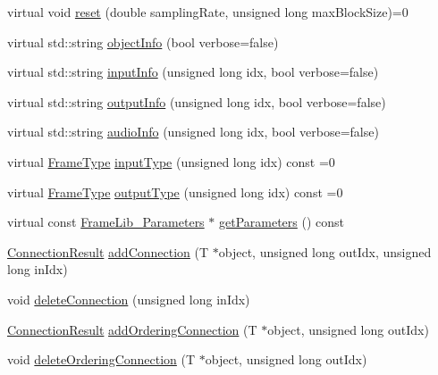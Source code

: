 \begin{DoxyCompactItemize}
\item 
virtual void \hyperlink{class_frame_lib___object_aeb02311ab422dd569aeb982e31a66893}{reset} (double sampling\+Rate, unsigned long max\+Block\+Size)=0
\item 
virtual std\+::string \hyperlink{class_frame_lib___object_a10d673de9a3c59ace6a22ba1cff313c8}{object\+Info} (bool verbose=false)
\item 
virtual std\+::string \hyperlink{class_frame_lib___object_a49abea5f18125c425b1eae8710735891}{input\+Info} (unsigned long idx, bool verbose=false)
\item 
virtual std\+::string \hyperlink{class_frame_lib___object_a6e6d79e8d620eedbaa50abf324cdedf5}{output\+Info} (unsigned long idx, bool verbose=false)
\item 
virtual std\+::string \hyperlink{class_frame_lib___object_af618fcdec82b457911147c7c293bedd7}{audio\+Info} (unsigned long idx, bool verbose=false)
\item 
virtual \hyperlink{_frame_lib___types_8h_ad495a9f61af7fff07d7e97979d1ab854}{Frame\+Type} \hyperlink{class_frame_lib___object_ab1ab1ae8180bb8b7e881aac6a4e1066c}{input\+Type} (unsigned long idx) const =0
\item 
virtual \hyperlink{_frame_lib___types_8h_ad495a9f61af7fff07d7e97979d1ab854}{Frame\+Type} \hyperlink{class_frame_lib___object_a03eb408844f15d8f73cee67f43149b9d}{output\+Type} (unsigned long idx) const =0
\item 
virtual const \hyperlink{class_frame_lib___parameters}{Frame\+Lib\+\_\+\+Parameters} $\ast$ \hyperlink{class_frame_lib___object_ac90a6770aeef26ee1601889dc16dba56}{get\+Parameters} () const
\item 
\hyperlink{_frame_lib___types_8h_a2a427ca8c6f961bac8e41f6edecf0722}{Connection\+Result} \hyperlink{class_frame_lib___object_a216a018651f08f5779d40fd243921527}{add\+Connection} (T $\ast$object, unsigned long out\+Idx, unsigned long in\+Idx)
\item 
void \hyperlink{class_frame_lib___object_aa7dbc1735ebd68008abd939d50edce49}{delete\+Connection} (unsigned long in\+Idx)
\item 
\hyperlink{_frame_lib___types_8h_a2a427ca8c6f961bac8e41f6edecf0722}{Connection\+Result} \hyperlink{class_frame_lib___object_a3e403445d93444a203604fcb3bfd8fe6}{add\+Ordering\+Connection} (T $\ast$object, unsigned long out\+Idx)
\item 
void \hyperlink{class_frame_lib___object_a62c0bd0e7ab5c0be547692711128a611}{delete\+Ordering\+Connection} (T $\ast$object, unsigned long out\+Idx)

\end{DoxyCompactItemize}
